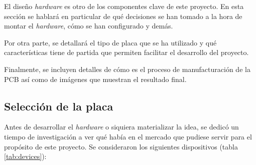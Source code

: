 El diseño \textit{hardware} es otro de los componentes clave de este proyecto. En esta
sección se hablará en particular de qué decisiones se han tomado a la hora de montar
el \textit{hardware}, cómo se han configurado y demás.

Por otra parte, se detallará el tipo de placa que se ha utilizado y qué características
tiene de partida que permiten facilitar el desarrollo del proyecto.

Finalmente, se incluyen detalles de cómo es el proceso de manufacturación de la PCB
así como de imágenes que muestran el resultado final.

\subsection{Selección de la placa}
Antes de desarrollar el \textit{hardware} o siquiera materializar la idea, se dedicó
un tiempo de investigación a ver qué había en el mercado que pudiese servir para
el propósito de este proyecto. Se consideraron los siguientes dispositivos (tabla
\ref{tab:devices}):


